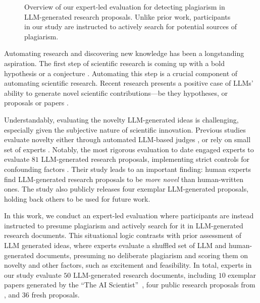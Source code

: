\begin{figure*}[t]
    \caption{Overview of our expert-led evaluation for detecting plagiarism in LLM-generated research proposals. Unlike prior work, participants in our study are instructed to actively search for potential sources of plagiarism.}
    \label{fig:expert-evaluation-setup}
\end{figure*}

Automating research and discovering new knowledge 
has been a longstanding aspiration. 
The first step of 
scientific research is 
coming up with a bold hypothesis or a conjecture \citep{popper2014conjectures}. 
Automating this step is a crucial component of automating scientific research.
Recent research presents a positive case of
LLMs' ability to 
generate novel scientific contributions---be they hypotheses, or proposals or papers \citep{li2024chain,lu2024ai, baek2024researchagent, li2024mlr, wang2023scimon, yang2023large, li2024learning, weng2024cycleresearcher}. 

Understandably, 
evaluating the novelty LLM-generated ideas 
is challenging, especially 
given the subjective nature of scientific innovation. 
Previous studies 
evaluate novelty either through automated LLM-based judges \citep{lu2024ai}, or rely on small set of 
experts \citep{li2024chain, baek2024researchagent, li2024mlr, wang2023scimon, yang2023large, li2024learning, weng2024cycleresearcher}. 
Notably, the most 
rigorous evaluation to date 
engaged  experts %
to evaluate $81$ LLM-generated research proposals, 
implementing strict controls for confounding factors \citep{si2024can}. 
Their study leads to an  
important finding: 
human experts find LLM-generated research 
proposals 
to be \emph{more novel} than human-written ones.
The study 
also publicly releases 
four 
exemplar LLM-generated proposals,
holding back others to be used for future work. 


In this work, we conduct an expert-led 
evaluation 
where participants 
are instead  
instructed to presume plagiarism and 
actively search for it in LLM-generated research documents. 
This situational logic \citep{popper2013poverty, hoover2016situational} contrasts 
with prior assessment of LLM generated ideas,
where experts evaluate a shuffled set 
of LLM and human-generated documents, 
presuming no deliberate plagiarism 
and scoring them on novelty and other factors, such as excitement and feasibility. 
In total, 
experts in our study evaluate 
$50$ LLM-generated research documents, 
including $10$ 
exemplar papers 
generated by the ``The AI Scientist''~\citep{lu2024ai}, 
four 
public research proposals from \citet{si2024can}, 
and $36$ fresh proposals.


